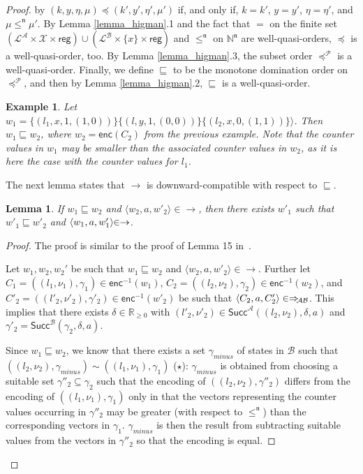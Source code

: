\documentclass{CSML}
\theoremstyle{plain}\newtheorem{theorem}[thm]{Theorem}
\theoremstyle{plain}\newtheorem{corollary}[thm]{Corollary}
\theoremstyle{plain}\newtheorem{example}[thm]{Example}
\theoremstyle{plain}\newtheorem{lemma}[thm]{Lemma}
\theoremstyle{plain}\newtheorem{remark}[thm]{Remark}
\newcommand{\N}{\mathbb{N}}
\newcommand{\RP}{\mathbb{R}_{\geq 0}}
\newcommand{\B}{\mathcal{B}}
\newcommand{\reg}{\mathsf{reg}}
\newcommand{\locs}{\mathcal{L}}
\newcommand{\clocks}{\mathcal{X}}
\newcommand{\loc}{\mathit{l}}
\renewcommand{\succ}{\mathsf{Succ}}
\newcommand{\enc}{\mathsf{enc}}
\newcommand{\A}{\mathcal{A}}
\newcommand{\transAB}{\Rightarrow_{\hspace{-.8mm}\A\B}}
\begin{document}
\begin{proof}
		by $(k,y,\eta,\mu)\preceq (k',y',\eta',\mu')$ if, and only if, $k=k'$, $y=y'$, $\eta=\eta'$, and $\mu\leq^{\mathfrak{n}}\mu'$. 
		By Lemma \ref{lemma_higman}.1 and the fact that $=$ on the finite set $(\locs^\A \times \clocks\times \reg) \cup (\locs^\B \times \{x\}\times \reg)$ and $\leq^{\mathfrak{n}}$ on $\N^{\mathfrak{n}}$ are well-quasi-orders, 
		$\preceq$ is a well-quasi-order, too.
		By Lemma \ref{lemma_higman}.3, the subset order $\preceq^\mathcal{P}$ is a well-quasi-order. 
		Finally, we define $\sqsubseteq$ to be the monotone domination order on $\preceq^\mathcal{P}$, and then by Lemma \ref{lemma_higman}.2, 
		$\sqsubseteq$ is a well-quasi-order. 
		\begin{example}
Let $w_1 = \{(\loc_1,x,1,(1,0))\}\{(\loc,y,1,(0,0))\}\{(\loc_2,x,0,(1,1))\}\rangle$.
			Then $w_1 \sqsubseteq w_2$, where $w_2=\enc(C_2)$ from the previous example. Note that the counter values in $w_1$ may be smaller than the associated counter values in $w_2$, as it is here the case with the counter values for $\loc_1$. 
		\end{example}		
		The next lemma states that $\to$ is downward-compatible with respect to $\sqsubseteq$. 
		\begin{lemma}
			\label{lemma_dc}
			If $w_1\sqsubseteq w_2$ and $\langle w_2,a, w'_2\rangle\in\to$, then there exists $w'_1$ such that $w'_1\sqsubseteq w'_2$ and $\langle w_1,a, w'_1\rangle\hspace{-1.1mm}\in\to$.
		\end{lemma}
		\begin{proof}
			The proof is similar to the proof of Lemma 15 in~\cite{DBLP:conf/lics/OuaknineW04}.
			
			Let $w_1, w_2, w_2'$ be such that $w_1\sqsubseteq w_2$ and $\langle w_2,a,w'_2\rangle\in\to$.
			Further let 
			$C_1=((\loc_1,\nu_1),\gamma_1)\in \enc^{-1}(w_1)$, 
			$C_2=((\loc_2,\nu_2),\gamma_2)\in\enc^{-1}(w_2)$, 
			and $C'_2=((\loc'_2,\nu'_2),\gamma'_2)\in\enc^{-1}(w'_2)$ be such that \newline$\langle C_2,a, C'_2\rangle\in\transAB$. 
			This implies that 
			there exists $\delta\in\RP$ with
			$(\loc'_2,\nu'_2)\in\succ^\A((\loc_2,\nu_2),\delta,a)$ and
			$\gamma'_2=\succ^\B(\gamma_2,\delta,a)$. 
			
			


			Since $w_1\sqsubseteq w_2$, 
			we know that there exists a set $\gamma_{minus}$ of states in  $\B$  such that
			$((\loc_2,\nu_2),\gamma_{minus})\sim ((\loc_1,\nu_1),\gamma_1)$ ($\star$): $\gamma_{minus}$ is obtained from choosing a suitable set $\gamma''_2\subseteq \gamma_2$
			such that the encoding of $((\loc_2,\nu_2),\gamma''_2)$ differs from the encoding of $((\loc_1,\nu_1),\gamma_1)$ only in that the vectors representing the counter values occurring in $\gamma''_2$ may be greater (with respect to $\leq^{\mathfrak{n}}$) than the corresponding vectors in $\gamma_1$.  
			$\gamma_{minus}$  is then the result from subtracting suitable values from the vectors in $\gamma''_2$ so that the encoding is equal. 



\end{proof}
\end{proof}
\end{document}
